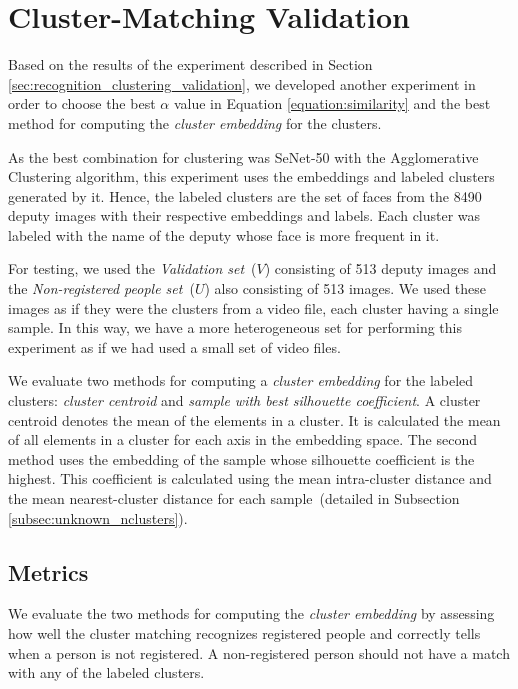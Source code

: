 \section{Cluster-Matching Validation}
\label{sec:recognition_matching_validation}

Based on the results of the experiment described in Section \ref{sec:recognition_clustering_validation}, we developed another experiment in order to choose the best $\alpha$ value in Equation \ref{equation:similarity} and the best method for computing the \emph{cluster embedding} for the clusters.

As the best combination for clustering was SeNet-50 with the Agglomerative Clustering algorithm, this experiment uses the embeddings and labeled clusters generated by it.
Hence, the labeled clusters are the set of faces from the 8490 deputy images with their respective embeddings and labels.
Each cluster was labeled with the name of the deputy whose face is more frequent in it.

For testing, we used the \emph{Validation set}~($V$) consisting of 513 deputy images and the \emph{Non-registered people set}~($U$) also consisting of 513 images.
We used these images as if they were the clusters from a video file, each cluster having a single sample.
In this way, we have a more heterogeneous set for performing this experiment as if we had used a small set of video files.

We evaluate two methods for computing a \emph{cluster embedding} for the labeled clusters: \emph{cluster centroid} and \emph{sample with best silhouette coefficient}. A cluster centroid denotes the mean of the elements in a cluster.
It is calculated the mean of all elements in a cluster for each axis in the embedding space. The second method uses the embedding of the sample whose silhouette coefficient is the highest.
This coefficient is calculated using the mean intra-cluster distance and the mean nearest-cluster distance for each sample~(detailed in Subsection \ref{subsec:unknown_nclusters}).

\subsection{Metrics}

We evaluate the two methods for computing the \emph{cluster embedding} by assessing how well the cluster matching recognizes registered people and correctly tells when a person is not registered.
A non-registered person should not have a match with any of the labeled clusters.

